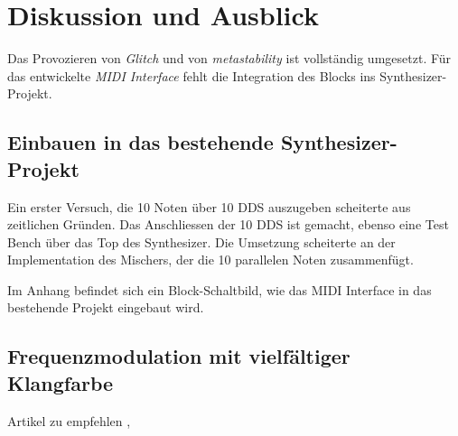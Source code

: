 
\chapter{Diskussion und Ausblick}\label{chap.diskussion}

Das Provozieren von \textit{Glitch} und von \textit{metastability} ist vollständig umgesetzt. Für das entwickelte \textit{MIDI Interface} fehlt die Integration des Blocks ins Synthesizer-Projekt. 

\section{Einbauen in das bestehende Synthesizer-Projekt}

Ein erster Versuch, die 10 Noten über 10 DDS auszugeben scheiterte aus zeitlichen Gründen. Das Anschliessen der 10 DDS ist gemacht, ebenso eine Test Bench über das Top des Synthesizer. Die Umsetzung scheiterte an der Implementation des Mischers, der die 10 parallelen Noten zusammenfügt.

Im Anhang befindet sich ein Block-Schaltbild, wie das MIDI Interface in das bestehende Projekt eingebaut wird. 

\section{Frequenzmodulation mit vielfältiger Klangfarbe}
Artikel zu empfehlen \citep{synthesizer_1}, \citep{synthesizer_2}

